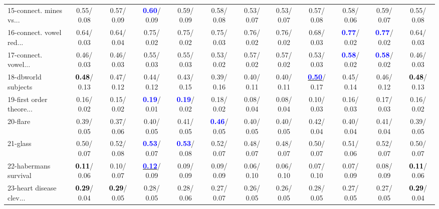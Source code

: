 \begin{table}[h]
\begin{center}
{\begin{tabular}{lc|c|c|c|c|c|c|c|c|c|c}
15-connect. mines vs... &   0.55/  0.08 &   0.57/  0.09 & \textcolor{blue}{\textbf{  0.60}}/  0.09 &   0.59/  0.09 &   0.58/  0.08 &   0.53/  0.07 &   0.53/  0.07 &   0.57/  0.08 &   0.58/  0.06 &   0.59/  0.07 &   0.55/  0.08 \\
16-connect. vowel red... &   0.64/  0.03 &   0.64/  0.04 &   0.75/  0.02 &   0.75/  0.02 &   0.75/  0.03 &   0.76/  0.02 &   0.76/  0.02 &   0.68/  0.03 & \textcolor{blue}{\textbf{  0.77}}/  0.02 & \textcolor{blue}{\textbf{  0.77}}/  0.02 &   0.64/  0.03 \\
17-connect. vowel... &   0.46/  0.03 &   0.46/  0.03 &   0.55/  0.03 &   0.55/  0.03 &   0.53/  0.02 &   0.57/  0.02 &   0.57/  0.02 &   0.53/  0.03 & \textcolor{blue}{\textbf{  0.58}}/  0.02 & \textcolor{blue}{\textbf{  0.58}}/  0.02 &   0.46/  0.03 \\
18-dbworld subjects & \textcolor{black}{\textbf{  0.48}}/  0.13 &   0.47/  0.12 &   0.44/  0.12 &   0.43/  0.15 &   0.39/  0.16 &   0.40/  0.11 &   0.40/  0.11 & \underline{\textcolor{blue}{\textbf{  0.50}}}/  0.17 &   0.45/  0.14 &   0.46/  0.12 & \textcolor{black}{\textbf{  0.48}}/  0.13 \\
19-first order theore... &   0.16/  0.02 &   0.15/  0.02 & \textcolor{blue}{\textbf{  0.19}}/  0.01 & \textcolor{blue}{\textbf{  0.19}}/  0.02 &   0.18/  0.02 &   0.08/  0.04 &   0.08/  0.04 &   0.10/  0.03 &   0.16/  0.03 &   0.17/  0.03 &   0.16/  0.02 \\
20-flare &   0.39/  0.05 &   0.37/  0.06 &   0.40/  0.05 &   0.41/  0.05 & \textcolor{blue}{\textbf{  0.46}}/  0.05 &   0.40/  0.05 &   0.40/  0.05 &   0.42/  0.04 &   0.40/  0.04 &   0.41/  0.04 &   0.39/  0.05 \\
21-glass &   0.50/  0.07 &   0.52/  0.08 & \textcolor{blue}{\textbf{  0.53}}/  0.07 & \textcolor{blue}{\textbf{  0.53}}/  0.08 &   0.52/  0.07 &   0.48/  0.07 &   0.48/  0.07 &   0.50/  0.07 &   0.51/  0.06 &   0.52/  0.07 &   0.50/  0.07 \\ \hline
22-habermans survival & \textcolor{black}{\textbf{  0.11}}/  0.06 &   0.10/  0.07 & \underline{\textcolor{blue}{\textbf{  0.12}}}/  0.09 &   0.09/  0.09 &   0.09/  0.09 &   0.06/  0.10 &   0.06/  0.10 &   0.07/  0.10 &   0.07/  0.09 &   0.08/  0.09 & \textcolor{black}{\textbf{  0.11}}/  0.06 \\
23-heart disease clev... & \textcolor{black}{\textbf{  0.29}}/  0.04 & \textcolor{black}{\textbf{  0.29}}/  0.05 &   0.28/  0.05 &   0.28/  0.06 &   0.27/  0.07 &   0.26/  0.05 &   0.26/  0.05 &   0.28/  0.05 &   0.27/  0.05 &   0.27/  0.05 & \textcolor{black}{\textbf{  0.29}}/  0.04 \\

\end{tabular}}
\end{center}
\end{table}
